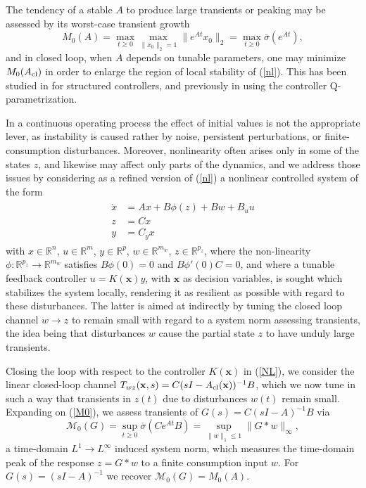 \documentclass[12pt, a4paper,reqno]{amsart}
\newcommand{\x}{\mathbf x}
\theoremstyle{definition}
\begin{document}
The tendency of a stable  $A$ to produce large transients or peaking 
may be assessed by its
worst-case transient growth
\begin{equation}
\label{M0}
M_0(A)= \max_{t\geq 0}
\max_{\|x_0\|_2=1} \|e^{At}x_0\|_2 = \max_{t\geq 0} \overline{\sigma}(e^{At}),
\end{equation}
and in closed loop, when $A$ depends on tunable parameters, one may minimize $M_0(A_{\rm cl})$
in order to enlarge the region of local stability of (\ref{nl}). This has been studied in \cite{an_kreiss} for structured controllers, and previously in \cite{hinrichsen} using the controller Q-parametrization.





In a continuous operating process the effect of initial values is not the appropriate  
lever, as instability is caused rather by noise, persistent perturbations, or finite-consumption disturbances. 
Moreover,
nonlinearity often arises only in some
of the states $z$,  and likewise may  affect only parts of the dynamics,   and  
we address those issues by considering as a refined version of (\ref{nl}) a nonlinear controlled system
of the form
\begin{align}
\label{NL}
\begin{split}
\dot{x} &= Ax + B\phi(z)+ Bw  + B_uu\\
z &= Cx \\
y &= C_yx
\end{split}
\end{align}
with  $x\in \mathbb R^n$, $u\in \mathbb R^m$, $y\in \mathbb R^p$, $w\in \mathbb R^{m_w}$, $z\in \mathbb R^{p_z}$,
where the non-linearity $\phi:\mathbb R^{p_z} \to \mathbb R^{m_w}$
satisfies $B\phi(0)=0$ and $B\phi'(0)C=0$, and where a tunable feedback controller $u = K(\x) y$, with $\x$ as decision variables, is sought 
which stabilizes
the system locally, rendering it as resilient  as possible with regard to these disturbances.
The latter is aimed at indirectly by tuning the
closed loop channel $w \to z$ to remain small with regard to a system norm assessing transients, the idea being
that disturbances $w$ cause the partial state $z$ to have unduly large transients. 

Closing the loop with respect to the controller $K(\x)$ in (\ref{NL}), we consider the linear closed-loop channel
$T_{wz}(\x,s) = C(sI- A_{\rm cl}(\x))^{-1} B$, which we now tune in such a way that transients in $z(t)$ due to disturbances
$w(t)$ remain small. 
%
Expanding on (\ref{M0}), we assess transients of $G(s)=C(sI-A)^{-1}B$ via 
\begin{equation}
    \label{M}
\mathcal M_0(G) = \sup_{t\geq 0}  \overline{\sigma}\left( Ce^{At}B\right) = \sup_{\|w\|_1\leq 1} \| G \ast w\|_\infty,
\end{equation}
a time-domain $L^1 \to L^\infty$ induced system norm,  
which measures the time-domain peak of the response $z=G \ast w$ 
to a finite consumption input $w$. For $G(s)=(sI-A)^{-1}$ we recover $\mathcal M_0(G)=M_0(A)$. 
\end{document}
